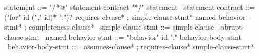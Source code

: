 \begin{syntax}
  statement ::= "/*@" statement-contract "*/" statement
  \
  statement-contract ::= {("for" id ("," id)* ":")?} requires-clause* ;
    simple-clause-stmt* named-behavior-stmt* ;
    completeness-clause*
  \
  simple-clause-stmt ::= simple-clause | { abrupt-clause-stmt }
  \
  named-behavior-stmt ::= "behavior" id ":" behavior-body-stmt
  \
  behavior-body-stmt ::= assumes-clause* ;
       requires-clause* simple-clause-stmt*
\end{syntax}

